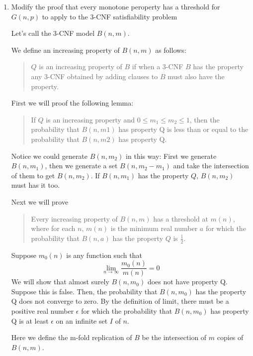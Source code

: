 \documentclass[a4paper, 12pt]{mcshw}
\begin{document}
\begin{enumerate}
    \item Modify the proof that every monotone peroperty has a threshold for $G(n, p)$ to apply to the 3-CNF satisfiability problem
        \begin{solution}
            Let's call the 3-CNF model $B(n, m)$.

            We define an increasing property of $B(n, m)$ as follows: 
            \begin{quote}
                $Q$ is an increasing property of $B$ if when a 3-CNF $B$ has the property any 3-CNF obtained by adding clauses to $B$ must also have the property.
            \end{quote}
            First we will proof the following lemma: 
            \begin{quote}
                If $Q$ is an increasing property and $0 \leq m_1 \leq m_2 \leq 1$, then the probability that $B(n, m1)$ has property Q is less than or equal to the probability that $B(n, m2)$ has property Q.
            \end{quote}
            Notice we could generate $B(n, m_2)$ in this way: First we generate $B(n, m_1)$, then we generate a set $B(n, m_2 - m_1)$ and take the intersection of them to get $B(n, m_2)$. If $B(n, m_1)$ has the property $Q$, $B(n, m_2)$ must has it too. 

            Next we will prove
            \begin{quote}
                Every increasing property of $B(n, m)$ has a threshold at $m(n)$, where for each $n$, $m(n)$ is the minimum real number $a$ for which the probability that $B(n, a)$ has the property $Q$ is $\frac{1}{2}$.
            \end{quote}
            Suppose $m_0(n)$ is any function such that
            $$\lim_{n\to\infty}\frac{m_0(n)}{m(n)} = 0$$
            We will show that almost surely $B(n, m_0)$ does not have property Q. Suppose this is false. Then, the probability that $B(n, m_0)$ has the property Q does not converge to zero. By the definition of limit, there must be a positive real number $\epsilon$ for which the probability that $B(n, m_0)$ has property Q is at least $\epsilon$ on an infinite set $I$ of $n$. 
            
            Here we define the m-fold replication of $B$ be the intersection of $m$ copies of $B(n, m)$.


\end{solution}
\end{enumerate}
\end{document}
